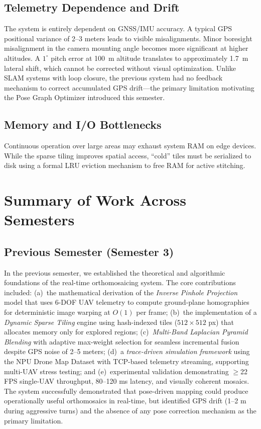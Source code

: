 \documentclass[conference]{IEEEtran}
\begin{document}
\subsection{Telemetry Dependence and Drift}
The system is entirely dependent on GNSS/IMU accuracy. A typical GPS positional variance of 2--3 meters leads to visible misalignments. Minor boresight misalignment in the camera mounting angle becomes more significant at higher altitudes. A $1^{\circ}$ pitch error at 100~m altitude translates to approximately 1.7~m lateral shift, which cannot be corrected without visual optimization. Unlike SLAM systems with loop closure, the previous system had no feedback mechanism to correct accumulated GPS drift---the primary limitation motivating the Pose Graph Optimizer introduced this semester.

\subsection{Memory and I/O Bottlenecks}
Continuous operation over large areas may exhaust system RAM on edge devices. While the sparse tiling improves spatial access, ``cold'' tiles must be serialized to disk using a formal LRU eviction mechanism to free RAM for active stitching.

\section{Summary of Work Across Semesters}
\label{sec:summaries}

\subsection{Previous Semester (Semester 3)}

In the previous semester, we established the theoretical and algorithmic foundations of the real-time orthomosaicing system. The core contributions included: (a)~the mathematical derivation of the \textit{Inverse Pinhole Projection} model that uses 6-DOF UAV telemetry to compute ground-plane homographies for deterministic image warping at $O(1)$ per frame; (b)~the implementation of a \textit{Dynamic Sparse Tiling} engine using hash-indexed tiles ($512 \times 512$ px) that allocates memory only for explored regions; (c)~\textit{Multi-Band Laplacian Pyramid Blending} with adaptive max-weight selection for seamless incremental fusion despite GPS noise of 2--5 meters; (d)~a \textit{trace-driven simulation framework} using the NPU Drone Map Dataset with TCP-based telemetry streaming, supporting multi-UAV stress testing; and (e)~experimental validation demonstrating $\geq$22 FPS single-UAV throughput, 80--120 ms latency, and visually coherent mosaics. The system successfully demonstrated that pose-driven mapping could produce operationally useful orthomosaics in real-time, but identified GPS drift (1--2 m during aggressive turns) and the absence of any pose correction mechanism as the primary limitation.
\end{document}
